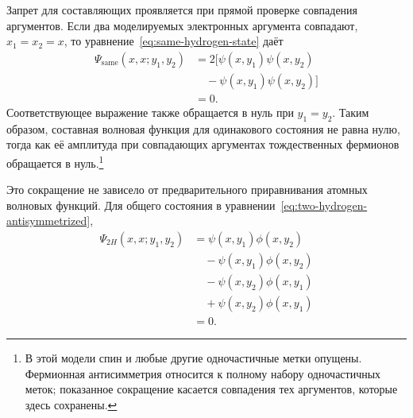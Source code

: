 Запрет для составляющих проявляется при прямой проверке совпадения аргументов. Если два моделируемых электронных аргумента совпадают, \(x_1=x_2=x\), то уравнение~\eqref{eq:same-hydrogen-state} даёт
\begin{align}
\Psi_{\mathrm{same}}(x,x;y_1,y_2)
&=2\bigl[
\psi(x,y_1)\psi(x,y_2)\nonumber\\
&\quad{}-\psi(x,y_1)\psi(x,y_2)
\bigr]\\
&=0.
\end{align}
Соответствующее выражение также обращается в нуль при \(y_1=y_2\). Таким образом, составная волновая функция для одинакового состояния не равна нулю, тогда как её амплитуда при совпадающих аргументах тождественных фермионов обращается в нуль.\footnote{В этой модели спин и любые другие одночастичные метки опущены. Фермионная антисимметрия относится к полному набору одночастичных меток; показанное сокращение касается совпадения тех аргументов, которые здесь сохранены.}

\begin{classroomqa}
\end{classroomqa}

\begin{classroomqa}
\end{classroomqa}

Это сокращение не зависело от предварительного приравнивания атомных волновых функций. Для общего состояния в уравнении~\eqref{eq:two-hydrogen-antisymmetrized},
\begin{align}
\Psi_{2H}(x,x;y_1,y_2)
&=\psi(x,y_1)\phi(x,y_2)\nonumber\\
&\quad{}-\psi(x,y_1)\phi(x,y_2)\nonumber\\
&\quad{}-\psi(x,y_2)\phi(x,y_1)\nonumber\\
&\quad{}+\psi(x,y_2)\phi(x,y_1)\\
&=0.
\end{align}


